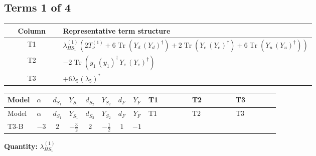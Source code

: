 \documentclass[8pt]{article}
\begin{document}
\begin{landscape}
\subsection*{Terms 1 of 4}
\begin{center}
\begin{tabular}{@{}c >{\raggedright\arraybackslash}p{0.82\linewidth}@{}}
\toprule
Column & Representative term structure \\
\midrule
T1 & \(\displaystyle {\lambda_{HS_1}^{(1)}} (2 T_{\nu}^{(1)}+6 \operatorname{Tr}\!\left({Y_d}\,\left({Y_d}\right)^{\dagger}\right)+2 \operatorname{Tr}\!\left({Y_e}\,\left({Y_e}\right)^{\dagger}\right)+6 \operatorname{Tr}\!\left({Y_u}\,\left({Y_u}\right)^{\dagger}\right))\) \\
\midrule
T2 & \(\displaystyle -2 \operatorname{Tr}\!\left({y_1}\,\left({y_1}\right)^{\dagger}\,{Y_e}\,\left({Y_e}\right)^{\dagger}\right)\) \\
\midrule
T3 & \(\displaystyle +6 {\lambda_5} \left({\lambda_5}\right)^{*}\) \\
\midrule
\bottomrule
\end{tabular}
\end{center}
\smallskip
\tiny
\begin{longtable}{@{}llcccccc >{\raggedright\arraybackslash}p{0.21\linewidth} >{\raggedright\arraybackslash}p{0.21\linewidth} >{\raggedright\arraybackslash}p{0.21\linewidth}@{}}
\toprule
Model & $\alpha$ & $d_{S_1}$ & $Y_{S_1}$ & $d_{S_2}$ & $Y_{S_2}$ & $d_F$ & $Y_F$ & T1 & T2 & T3 \\
\midrule
\endfirsthead
\toprule
Model & $\alpha$ & $d_{S_1}$ & $Y_{S_1}$ & $d_{S_2}$ & $Y_{S_2}$ & $d_F$ & $Y_F$ & T1 & T2 & T3 \\
\midrule
\endhead
T3-B & $-3$ & $2$ & $-\frac{3}{2}$ & $2$ & $-\frac{1}{2}$ & $1$ & $-1$ & \scriptsize\adjustbox{max width=\linewidth}{$\begin{gathered} {\lambda_{HS_1}^{(1)}} (2 T_{\nu}^{(1)}+6 \operatorname{Tr}\!\left({Y_d}\,\left({Y_d}\right)^{\dagger}\right)+2 \operatorname{Tr}\!\left({Y_e}\,\left({Y_e}\right)^{\dagger}\right)+6 \operatorname{Tr}\!\left({Y_u}\,\left({Y_u}\right)^{\dagger}\right))\end{gathered}$} & \scriptsize\adjustbox{max width=\linewidth}{$\begin{gathered} -2 \operatorname{Tr}\!\left({y_1}\,\left({y_1}\right)^{\dagger}\,{Y_e}\,\left({Y_e}\right)^{\dagger}\right)\end{gathered}$} & \scriptsize\adjustbox{max width=\linewidth}{$\begin{gathered} +6 {\lambda_5} \left({\lambda_5}\right)^{*}\end{gathered}$} \\
\midrule
\bottomrule
\end{longtable}
\clearpage
\noindent\textbf{Quantity: }$\lambda_{HS_1}^{(1)}$\par\smallskip

\end{landscape}
\end{document}
